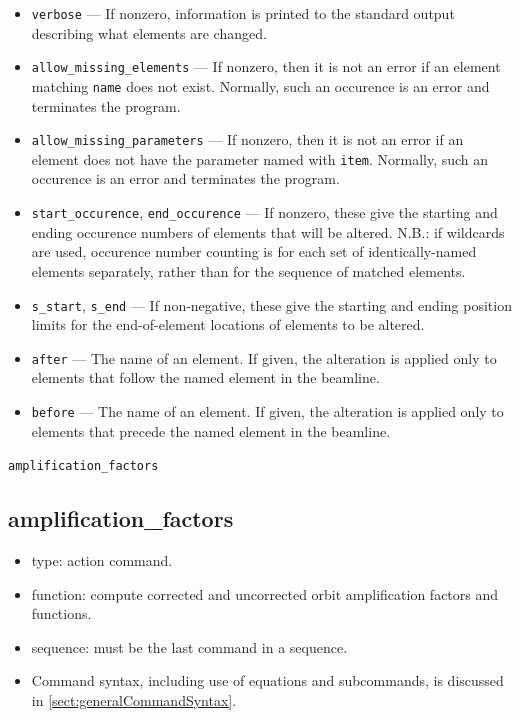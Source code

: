 \documentclass[11pt]{article}
\begin{document}
\begin{itemize}
  non-zero, the alteration takes place before any \verb|load_parameters| commands are processed.
\item \verb|verbose| --- If nonzero, information is printed to the standard output describing
        what elements are changed.
\item \verb|allow_missing_elements| --- If nonzero, then it is not an error if an
        element matching \verb|name| does not exist.   Normally, such
        an occurence is an error and terminates the program.
\item \verb|allow_missing_parameters| --- If nonzero, then it is not an error if an
        element does not have the parameter named with \verb|item|.  Normally, such
        an occurence is an error and terminates the program.
\item \verb|start_occurence|, \verb|end_occurence| --- If nonzero, these give the starting and
 ending occurence numbers of elements that will be altered.  N.B.: if wildcards are used, occurence
 number counting is for each set of identically-named elements separately, rather than for the sequence
 of matched elements.
\item \verb|s_start|, \verb|s_end| --- If non-negative, these give the starting and ending position
 limits for the end-of-element locations of elements to be altered.
\item \verb|after| --- The name of an element.  If given, the alteration is applied only to elements
 that follow the named element in the beamline.  
\item \verb|before| --- The name of an element.  If given, the alteration is applied only to elements
 that precede the named element in the beamline. 
\end{itemize}

\newpage
\begin{center}{\Large\verb|amplification_factors|}\end{center}
\subsection{amplification\_factors \label{subsec:amplificationfactors}}

\begin{itemize}
\item type: action command.
\item function: compute corrected and uncorrected orbit amplification factors and functions.
\item sequence: must be the last command in a sequence.
\item Command syntax, including use of equations and subcommands, is discussed in \ref{sect:generalCommandSyntax}.
\end{itemize}
\end{document}
